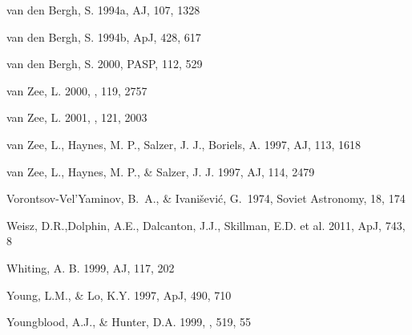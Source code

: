 \documentclass[12pt,preprint]{emulateapj}
\begin{document}
\begin{thebibliography}{}
van den Bergh, S. 1994a, AJ, 107, 1328

van den Bergh, S. 1994b, ApJ, 428, 617

van den Bergh, S. 2000, PASP, 112, 529

van Zee, L. 2000, \aj , 119, 2757

van Zee, L. 2001, \aj , 121, 2003

van Zee, L., Haynes, M. P., Salzer, J. J., Boriels, A. 1997, AJ, 113, 1618

van Zee, L., Haynes, M. P., \& Salzer, J. J. 1997, AJ, 114, 2479

Vorontsov-Vel'Yaminov, B.~A., \& 
Ivani{\v s}evi{\'c}, G.\ 1974, Soviet Astronomy, 18, 174 

Weisz, D.R.,Dolphin, A.E., Dalcanton, J.J., Skillman, E.D. et al. 2011, ApJ, 743, 8

Whiting, A. B. 1999, AJ, 117, 202

Young, L.M., \& Lo, K.Y. 1997, ApJ, 490, 710
 
Youngblood, A.J., \& Hunter, D.A. 1999, \apj , 519, 55

\end{thebibliography}

\clearpage

\end{document}
